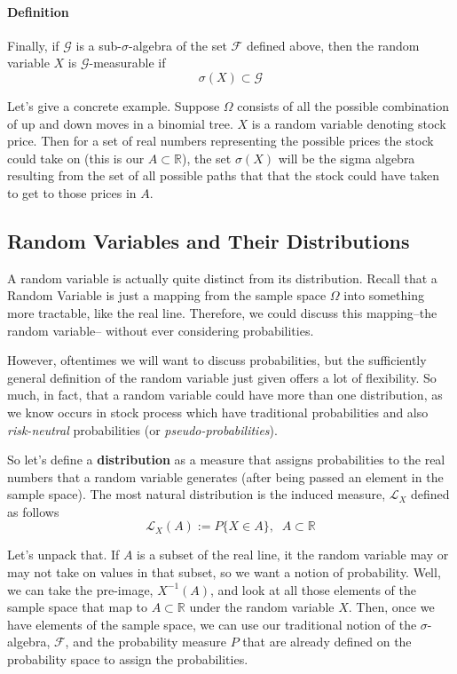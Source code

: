 \documentclass[a4paper,12pt]{scrartcl}
\begin{document}
\paragraph{Definition} Finally, if $\mathcal{G}$ is a 
sub-$\sigma$-algebra of the set $\mathcal{F}$ defined above, then the 
random variable $X$ is $\mathcal{G}$-measurable if 
   \[ \sigma(X) \subset \mathcal{G} \]

Let's give a concrete example.  Suppose $\Omega$ consists of all the 
possible combination of up and down moves in a binomial tree.  $X$ is
a random variable denoting stock price.  Then for a set of real numbers 
representing the possible prices the stock could take on (this is
our $A \subset \mathbb{R}$), the set $\sigma(X)$ will be the sigma 
algebra resulting from the set of all possible paths that that the
stock could have taken to get to those prices in $A$.

\subsection{Random Variables and Their Distributions}

A random variable is actually quite distinct from its distribution.  Recall that a Random Variable is just a mapping from the 
sample space $\Omega$ into something more tractable, like the real line.  Therefore, we could discuss this mapping--the random variable--
without ever considering probabilities.

However, oftentimes we will want to discuss probabilities, but the sufficiently general definition of the random variable just given
offers a lot of flexibility.  So much, in fact, that a random variable could have more than one distribution, as we know occurs in
stock process which have traditional probabilities and also \emph{risk-neutral} probabilities (or \emph{pseudo-probabilities}).

So let's define a \textbf{distribution} as a measure that assigns probabilities to the real numbers that a random variable generates 
(after being passed an element in the sample space).  The most natural distribution is the induced measure, $\mathcal{L}_X$ defined
as follows
\[ \mathcal{L}_X(A) := P \{ X \in A \}, \;\; A \subset \mathbb{R} \]

Let's unpack that. If $A$ is a subset of the real line, it the random variable may or may not take on values in that subset, so we want
a notion of probability.  Well, we can take the pre-image, $X^{-1}(A)$, and look at all those elements of the sample space that map to
$A \subset \mathbb{R}$ under the random variable $X$.  Then, once we have elements of the sample space, we can use our traditional notion
of the $\sigma$-algebra, $\mathcal{F}$, and the probability measure $P$ that are already defined on the probability space to assign
the probabilities.  
\end{document}
